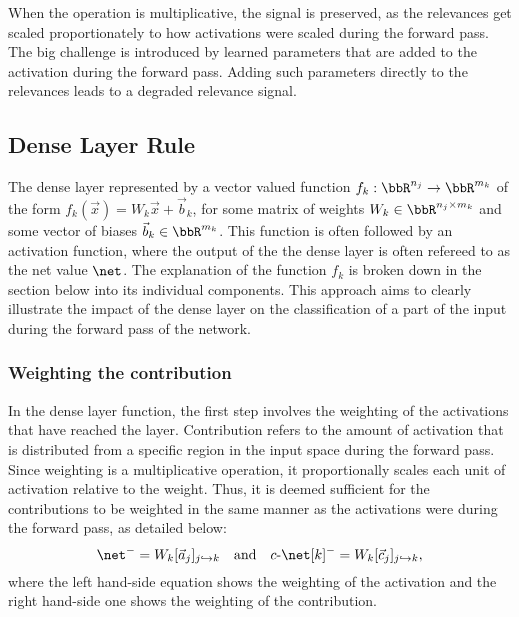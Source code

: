 When the operation is multiplicative, the signal is preserved, as the relevances get scaled proportionately to how activations were scaled during the forward pass. The big challenge is introduced by learned parameters that are added to the activation during the forward pass. Adding such parameters directly to the relevances leads to a degraded relevance signal. 





\subsection{Dense Layer Rule}
The dense layer represented by a vector valued function $f_k: \bbR^{n_j}\to \bbR^{m_k}$ of the form $f_k(\vec{x})= W_k \vec{x} + \vec{b}_k$, for some matrix of weights $W_k \in \bbR^{n_j\times m_k}$ and some vector of biases $\vec{b}_k \in \bbR^{m_k}$. This function is often followed by an activation function, where the output of the the dense layer is often refereed to as the net value $\net$. The explanation of the function $f_k$ is broken down in the section below into its individual components. This approach aims to clearly illustrate the impact of the dense layer on the classification of a part of the input during the forward pass of the network.

\subsubsection{Weighting the contribution}
In the dense layer function, the first step involves the weighting of the activations that have reached the layer. Contribution refers to the amount of activation that is distributed from a specific region in the input space during the forward pass. Since weighting is a multiplicative operation, it proportionally scales each unit of activation relative to the weight. Thus, it is deemed sufficient for the contributions to be weighted in the same manner as the activations were during the forward pass, as detailed below:
\begin{equation*}
    \net^- = W_k [\vec{a}_j]_{j\passto k}\quad\mbox{and}\quad
   \cnet^- = W_k[\vec{c}_j]_{j\passto k},
\end{equation*}
where the left hand-side equation shows the weighting of the activation and the right hand-side one shows the weighting of the contribution.

